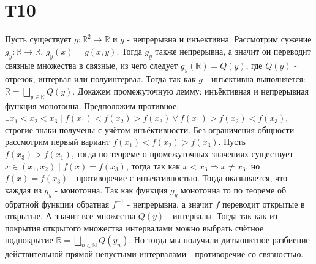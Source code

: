 \documentclass[12pt]{article}
\begin{document}
\section{Т10}
Пусть существует $g:\mathbb{R}^2 \to \mathbb{R}$ и $g$ - непрерывна и инъективна. Рассмотрим сужение $g_y: \mathbb{R} \to \mathbb{R}$, $g_y(x) = g(x, y)$.
Тогда $g_y$ также непрерывна, а значит он переводит связные множества в связные, из чего следует $g_y(\mathbb{R}) = Q(y)$, где $Q(y)$ - отрезок, интервал или полуинтервал.
Тогда так как $g$ - инъективна выполняется: $\mathbb{R} = \bigsqcup_{y \in \mathbb{R}} Q(y)$.
Докажем промежуточную лемму: инъёктивная и непрерывная функция монотонна. Предположим противное:
$\exists x_1 < x_2 < x_3 \mid f(x_1) < f(x_2) > f(x_3) \lor f(x_1) > f(x_2) < f(x_3)$, строгие знаки 
получены с учётом инъёктивности. Без ограничения общности рассмотрим первый вариант $f(x_1) < f(x_2) > f(x_3)$.
Пусть $f(x_3) > f(x_1)$, тогда по теореме о промежуточных значениях существует $x \in (x_1, x_2) \mid f(x) = f(x_3)$, 
тогда так как $x < x_3 \Rightarrow x \not = x_3$, но $f(x) = f(x_3)$ - противоречие с инъективностью.
Тогда оказывается, что каждая из $g_y$ - монотонна. Так как функция $g_y$ монотонна то по теореме об обратной
функции обратная $f^{-1}$ - непрерывна, а значит $f$ переводит открытые в открытые. А значит все множества
$Q(y)$ - интервалы. Тогда так как из покрытия открытого множества интервалами можно выбрать счётное подпокрытие $\mathbb{R} = \bigsqcup_{n \in \mathbb{N}} Q(y_n)$.
Но тогда мы получили дизъюнктное разбиение действительной прямой непустыми интервалами - противоречие со связностью.
\end{document}
